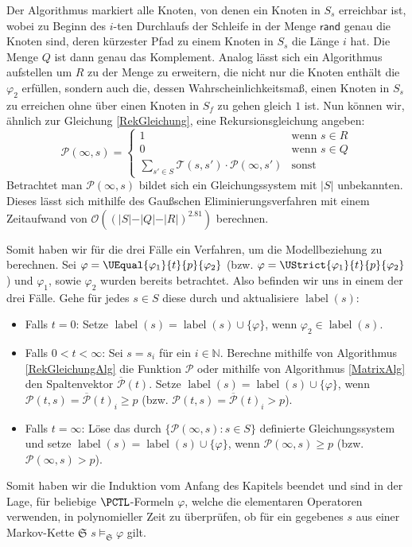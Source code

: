 Der Algorithmus markiert alle Knoten, von denen ein Knoten in $S_s$ erreichbar ist, wobei zu Beginn des $i$-ten Durchlaufs der Schleife in der Menge $\mathsf{rand}$ genau die Knoten sind, deren kürzester Pfad zu einem Knoten in $S_s$ die Länge $i$ hat.
Die Menge $Q$ ist dann genau das Komplement.
Analog lässt sich ein Algorithmus aufstellen um $R$ zu der Menge zu erweitern, die nicht nur die Knoten enthält die $\varphi_2$ erfüllen, sondern auch die, dessen Wahrscheinlichkeitsmaß, einen Knoten in $S_s$ zu erreichen ohne über einen Knoten in $S_f$ zu gehen gleich $1$ ist.
Nun können wir, ähnlich zur Gleichung \ref{RekGleichung}, eine Rekursionsgleichung angeben:
\begin{equation}
	\mathcal{P}(\infty, s) = \begin{cases}
		1 & \text{wenn } s\in R \\
		0 & \text{wenn } s\in Q \\
		\sum_{s'\in S} \mathcal{T}(s,s')\cdot \mathcal{P}(\infty, s') & \text{sonst}
	\end{cases}
\end{equation}
Betrachtet man $\mathcal{P}(\infty, s)$ bildet sich ein Gleichungssystem mit $\vert S \vert$ unbekannten. Dieses lässt sich mithilfe des Gaußschen Eliminierungsverfahren mit einem Zeitaufwand von $\mathcal{O}((\vert S \vert - \vert Q \vert - \vert R \vert)^{2.81})$ berechnen. \cite{hansson1994logic}

Somit haben wir für die drei Fälle ein Verfahren, um die Modellbeziehung zu berechnen. Sei $\varphi = \UEqual{\varphi_1}{t}{p}{\varphi_2}$ (bzw. $\varphi = \UStrict{\varphi_1}{t}{p}{\varphi_2}$) und $\varphi_1$, sowie $\varphi_2$ wurden bereits betrachtet.
Also befinden wir uns in einem der drei Fälle. Gehe für jedes $s\in S$ diese durch und aktualisiere $\operatorname{label}(s)$:
\begin{itemize}
	\item Falls $t=0$: Setze $\operatorname{label}(s) = \operatorname{label}(s)\cup \{\varphi\}$, wenn $\varphi_2\in \operatorname{label}(s)$.
	
	\item Falls $0<t<\infty$: Sei $s=s_i$ für ein $i\in \mathbb{N}$. Berechne mithilfe von Algorithmus \ref{RekGleichungAlg} die Funktion $\mathcal{P}$ oder mithilfe von Algorithmus \ref{MatrixAlg} den Spaltenvektor $\overline{\mathcal{P}}(t)$. 
	Setze $\operatorname{label}(s) = \operatorname{label}(s)\cup \{\varphi\}$, wenn $\mathcal{P}(t,s)=\overline{\mathcal{P}}(t)_i \geq p$ (bzw. $\mathcal{P}(t,s)=\overline{\mathcal{P}}(t)_i > p$).
	
	\item Falls $t=\infty$: Löse das durch $\{\mathcal{P}(\infty,s) : s\in S\}$ definierte Gleichungssystem und setze $\operatorname{label}(s) = \operatorname{label}(s)\cup \{\varphi\}$, wenn $\mathcal{P}(\infty,s) \geq p$ (bzw. $\mathcal{P}(\infty,s) > p$).
\end{itemize}
Somit haben wir die Induktion vom Anfang des Kapitels beendet und sind in der Lage, für beliebige $\PCTL$-Formeln $\varphi$, welche die elementaren Operatoren verwenden, in polynomieller Zeit zu überprüfen, ob für ein gegebenes $s$ aus einer Markov-Kette $\mathfrak{S}$ $s\models_\mathfrak{S} \varphi$ gilt.

